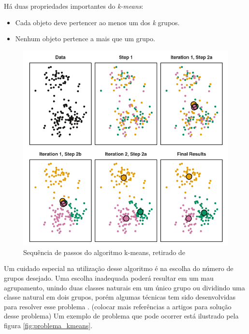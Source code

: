 \documentclass[a4paper,12pt]{article}
\begin{document}
Há duas propriedades importantes do \textit{k-means}:

\begin{itemize}
\item Cada objeto deve pertencer ao menos um dos \textit{k} grupos.
\item Nenhum objeto pertence a mais que um grupo.
\end{itemize}

\begin{figure}[H]
    \begin{center}
        \includegraphics[scale=0.65]{k_means_algorithm.png}
    \end{center}
    \caption{Sequência de passos do algoritmo k-means, retirado de \cite{experiment_clustering}}
    \label{fig:passos_kmeans}
\end{figure}

Um cuidado especial na utilização desse algoritmo é na escolha do número de grupos desejado. Uma escolha inadequada poderá resultar em um mau agrupamento, unindo duas classes naturais em um único grupo ou dividindo uma classe natural em dois grupos, porém algumas técnicas tem sido desenvolvidas para resolver esse problema \cite{Jain99, Manning09}. (colocar mais referências a artigos para solução desse problema) Um exemplo de problema que pode ocorrer está ilustrado pela figura \ref{fig:problema_kmeans}.
\end{document}
